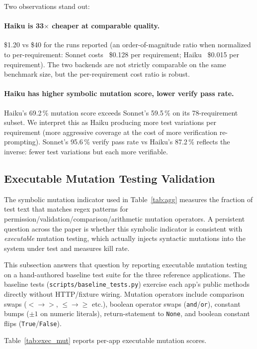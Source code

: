 \documentclass[10pt,twocolumn,letterpaper]{article}
\begin{document}
Two observations stand out:

\paragraph{Haiku is 33$\times$ cheaper at comparable quality.}
\$1.20 vs \$40 for the runs reported (an order-of-magnitude ratio
when normalized to per-requirement: Sonnet costs ~\$0.128 per
requirement; Haiku ~\$0.015 per requirement). The two backends are
not strictly comparable on the same benchmark size, but the
per-requirement cost ratio is robust.

\paragraph{Haiku has higher symbolic mutation score, lower verify
pass rate.}
Haiku's 69.2\,\% mutation score exceeds Sonnet's 59.5\,\% on its
78-requirement subset. We interpret this as Haiku producing more
test variations per requirement (more aggressive coverage at the cost
of more verification re-prompting). Sonnet's 95.6\,\% verify pass
rate vs Haiku's 87.2\,\% reflects the inverse: fewer test variations
but each more verifiable.

\subsection{Executable Mutation Testing Validation}
\label{sec:exec_mutation}

The symbolic mutation indicator used in
Table~\ref{tab:agg} measures the fraction of test text that
matches regex patterns for permission/validation/comparison/arithmetic
mutation operators. A persistent question across the paper is
whether this symbolic indicator is consistent with
\emph{executable} mutation testing, which actually injects syntactic
mutations into the system under test and measures kill rate.

This subsection answers that question by reporting executable
mutation testing on a hand-authored baseline test suite for the
three reference applications. The baseline tests
(\texttt{scripts/baseline\_tests.py}) exercise each app's public
methods directly without HTTP/fixture wiring. Mutation operators
include comparison swaps ($<\!\to\!>$, $\le\!\to\!\ge$ etc.),
boolean operator swaps (\texttt{and}/\texttt{or}), constant bumps
($\pm 1$ on numeric literals), return-statement to \texttt{None},
and boolean constant flips (\texttt{True}/\texttt{False}).

Table~\ref{tab:exec_mut} reports per-app executable mutation
scores.
\end{document}
